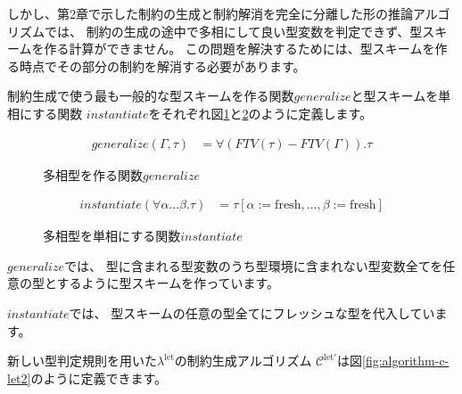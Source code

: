 しかし、第2章で示した制約の生成と制約解消を完全に分離した形の推論アルゴリズムでは、
制約の生成の途中で多相にして良い型変数を判定できず、型スキームを作る計算ができません。
この問題を解決するためには、型スキームを作る時点でその部分の制約を解消する必要があります。

制約生成で使う最も一般的な型スキームを作る関数$\mathit{generalize}$と型スキームを単相にする関数
$\mathit{instantiate}$をそれぞれ図\ref{fig:generalize}と\ref{fig:instantiate}のように定義します。

\begin{figure}[htbp]
  \begin{align*}
    \mathit{generalize}(\Gamma, \tau) &= \forall (FTV(\tau) - FTV(\Gamma)) . \tau
  \end{align*}
  \caption{多相型を作る関数$\mathit{generalize}$}
  \label{fig:generalize}
\end{figure}

\begin{figure}[htbp]
  \begin{align*}
    \mathit{instantiate}(\forall \alpha ... \beta . \tau) &=
      \tau [\alpha := \mathrm{fresh}, \dots, \beta := \mathrm{fresh}]
  \end{align*}
  \caption{多相型を単相にする関数$\mathit{instantiate}$}
  \label{fig:instantiate}
\end{figure}

$\mathit{generalize}$では、
型に含まれる型変数のうち型環境に含まれない型変数全てを任意の型とするように型スキームを作っています。

$\mathit{instantiate}$では、
型スキームの任意の型全てにフレッシュな型を代入しています。

新しい型判定規則を用いた$\lambda^\mathrm{let}$の制約生成アルゴリズム
$\mathcal C^\mathrm{let'}$は図\ref{fig:algorithm-c-let2}のように定義できます。

